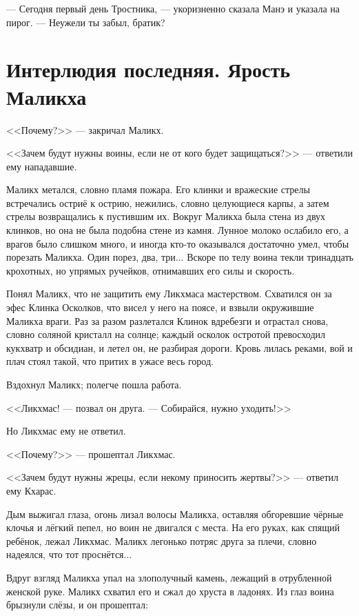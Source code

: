 --- Сегодня первый день Тростника, --- укоризненно сказала Манэ и указала на пирог.
--- Неужели ты забыл, братик?

\chapter*{Интерлюдия последняя. Ярость Маликха}

<<Почему?>> --- закричал Маликх.

<<Зачем будут нужны воины, если не от кого будет защищаться?>> --- ответили ему нападавшие.

\textspace

Маликх метался, словно пламя пожара.
Его клинки и вражеские стрелы встречались остриё к острию, нежились, словно целующиеся карпы, а затем стрелы возвращались к пустившим их.
Вокруг Маликха была стена из двух клинков, но она не была подобна стене из камня.
Лунное молоко ослабило его, а врагов было слишком много, и иногда кто-то оказывался достаточно умел, чтобы порезать Маликха.
Один порез, два, три...
Вскоре по телу воина текли тринадцать крохотных, но упрямых ручейков, отнимавших его силы и скорость.

Понял Маликх, что не защитить ему Ликхмаса мастерством.
Схватился он за эфес Клинка Осколков, что висел у него на поясе, и взвыли окружившие Маликха враги.
Раз за разом разлетался Клинок вдребезги и отрастал снова, словно соляной кристалл на солнце;
каждый осколок остротой превосходил кукхватр и обсидиан, и летел он, не разбирая дороги.
Кровь лилась реками, вой и плач стоял такой, что притих в ужасе весь город.

Вздохнул Маликх;
полегче пошла работа.

<<Ликхмас! --- позвал он друга.
--- Собирайся, нужно уходить!>>

Но Ликхмас ему не ответил.

\textspace

<<Почему?>> --- прошептал Ликхмас.

<<Зачем будут нужны жрецы, если некому приносить жертвы?>> --- ответил ему Кхарас.

\textspace

Дым выжигал глаза, огонь лизал волосы Маликха, оставляя обгоревшие чёрные клочья и лёгкий пепел, но воин не двигался с места.
На его руках, как спящий ребёнок, лежал Ликхмас.
Маликх легонько потряс друга за плечи, словно надеялся, что тот проснётся...

Вдруг взгляд Маликха упал на злополучный камень, лежащий в отрубленной женской руке.
Маликх схватил его и сжал до хруста в ладонях.
Из глаз воина брызнули слёзы, и он прошептал:

